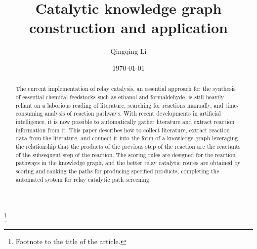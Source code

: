 \documentclass[%
 aip,
 jmp,%
 amsmath,amssymb,
 reprint,%
]{revtex4-2}
\begin{document}

\title[Catalytic knowledge graph construction and application]{Catalytic knowledge graph construction and application}%
\thanks{Footnote to the title of the article.}

\author{Qingqing Li}

\date{\today}%

\begin{abstract}
    The current implementation of relay catalysis, an essential approach for the synthesis of essential chemical feedstocks such as ethanol and formaldehyde, is still heavily reliant on a laborious reading of literature, searching for reactions manually, and time-consuming analysis of reaction pathways. With recent developments in artificial intelligence, it is now possible to automatically gather literature and extract reaction information from it. This paper describes how to collect literature, extract reaction data from the literature, and connect it into the form of a knowledge graph leveraging the relationship that the products of the previous step of the reaction are the reactants of the subsequent step of the reaction.  The scoring rules are designed for the reaction pathways in the knowledge graph, and the better relay catalytic routes are obtained by scoring and ranking the paths for producing specified products, completing the automated system for relay catalytic path screening.
\end{abstract}

\maketitle

\end{document}

